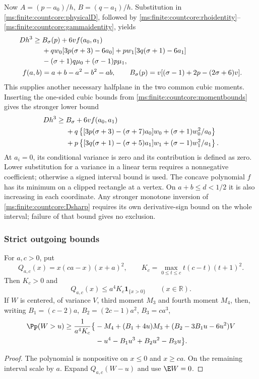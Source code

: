 Now \(A=(p-a_0)/h\), \(B=(q-a_1)/h\). Substitution in
\eqref{ms:finite:countcore:physicalD}, followed by
\eqref{ms:finite:countcore:rhoidentity}--\eqref{ms:finite:countcore:gammaidentity}, yields
\begin{align}
 Dh^3\ge{}&B_\sigma(p)+6v f(a_0,a_1)\notag\\
 &+qw_0[3p(\sigma+3)-6a_0]
   +pw_1[3q(\sigma+1)-6a_1]\notag\\
 &-(\sigma+1)q\mu_0+(\sigma-1)p\mu_1,
 \label{ms:finite:countcore:Dhalfplane}\\
 f(a,b)&=a+b-a^2-b^2-ab,\qquad
 B_\sigma(p)=v[(\sigma-1)+2p-(2\sigma+6)v].\notag
\end{align}
This supplies another necessary halfplane in the two common cubic moments.
Inserting the one-sided cubic bounds from
\eqref{ms:finite:countcore:momentbounds} gives the stronger lower bound
\begin{align}
 Dh^3\ge{}&B_\sigma+6vf(a_0,a_1)\notag\\
 &+q\left\{[3p(\sigma+3)-(\sigma+7)a_0]w_0
                    +(\sigma+1)w_0^2/a_0\right\}\notag\\
 &+p\left\{[3q(\sigma+1)-(\sigma+5)a_1]w_1
                    +(\sigma-1)w_1^2/a_1\right\}.
 \label{ms:finite:countcore:Dsharp}
\end{align}
At \(a_i=0\), its conditional variance is zero and its contribution is
defined as zero. Lower substitution for a variance in a linear term
requires a nonnegative coefficient; otherwise a signed interval bound is
used. The concave polynomial \(f\) has its minimum on a clipped rectangle
at a vertex. On \(a+b\le d<1/2\) it is also increasing in each
coordinate. Any stronger monotone inversion of
\eqref{ms:finite:countcore:Dsharp} requires its own derivative-sign bound on the
whole interval; failure of that bound gives no exclusion.

\subsubsection{Strict outgoing bounds}

\begin{lemma}
\label{ms:finite:countcore:quartic}
For \(a,c>0\), put
\[
 Q_{a,c}(x)=x(ca-x)(x+a)^2,
 \qquad K_c=\max_{0\le t\le c}t(c-t)(t+1)^2.
\]
Then \(K_c>0\) and
\[
 Q_{a,c}(x)\le a^4K_c\mathbf1_{\{x>0\}}\qquad(x\in\mathbb R).
\]
If \(W\) is centered, of variance \(V\), third moment \(M_3\) and
fourth moment \(M_4\), then, writing
\(B_1=(c-2)a\), \(B_2=(2c-1)a^2\), \(B_3=ca^3\),
\begin{align}
 \Pp(W>u)\ge\frac1{a^4K_c}\bigl\{
 &-M_4+(B_1+4u)M_3+(B_2-3B_1u-6u^2)V\notag\\
 &-u^4-B_1u^3+B_2u^2-B_3u\bigr\}.
 \label{ms:finite:countcore:outgoingquartic}
\end{align}
\end{lemma}
\begin{proof}
The polynomial is nonpositive on \(x\le0\) and \(x\ge ca\).
On the remaining interval scale by \(a\). Expand \(Q_{a,c}(W-u)\)
and use \(\E W=0\).
\end{proof}


